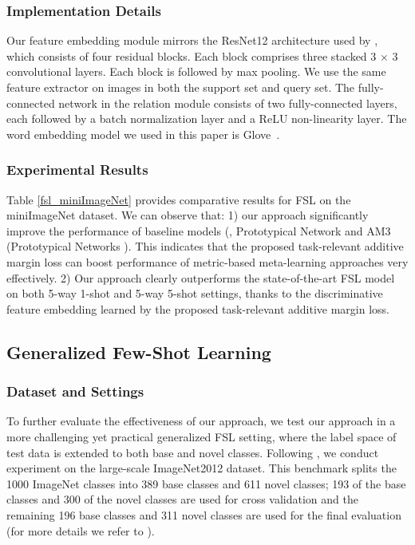 \documentclass[10pt,twocolumn,letterpaper]{article}
\begin{document}
\subsubsection{Implementation Details}

 Our feature embedding module mirrors the ResNet12 architecture used by \cite{Oreshkin2018nips}, which consists of four residual blocks. Each block comprises three stacked 3 $\times$ 3 convolutional layers. Each block is followed by max pooling. We use the same feature extractor on images in both the support set and query set. The fully-connected network in the relation module consists of two fully-connected layers, each followed by a batch normalization layer and a ReLU non-linearity layer. The word embedding model we used in this paper is Glove~\cite{glove}.

\subsubsection{Experimental Results}
\label{sec: mini}
Table \ref{fsl_miniImageNet} provides comparative results for FSL on the miniImageNet dataset. We can observe that: 1) our approach significantly improve the performance of baseline models (\ie, Prototypical Network \cite{Snell2017nips} and AM3 (Prototypical Networks \cite{Chen2019NIPS}). This indicates that the proposed task-relevant additive margin loss can boost performance of metric-based meta-learning approaches very effectively. 2) Our approach clearly outperforms the state-of-the-art FSL model on both 5-way 1-shot and 5-way 5-shot settings, thanks to the discriminative feature embedding learned by the proposed task-relevant additive margin loss. 

\subsection{Generalized Few-Shot Learning}

\subsubsection{Dataset and Settings}

To further evaluate the effectiveness of our approach, we test our approach in a more challenging yet practical generalized FSL setting, where the label space of test data is extended to both base and novel classes. Following \cite{Hariharan2017iccv,Wang2018cvprlsl,Gidaris2018cvpr}, we conduct experiment on the large-scale ImageNet2012 dataset. This benchmark splits the 1000 ImageNet classes into 389 base classes and 611 novel classes; 193 of the base classes and 300 of the novel classes are used for cross validation and the remaining 196 base classes and 311 novel classes are used for the final evaluation (for more details we refer to \cite{Hariharan2017iccv,Wang2018cvprlsl}). 
\end{document}
